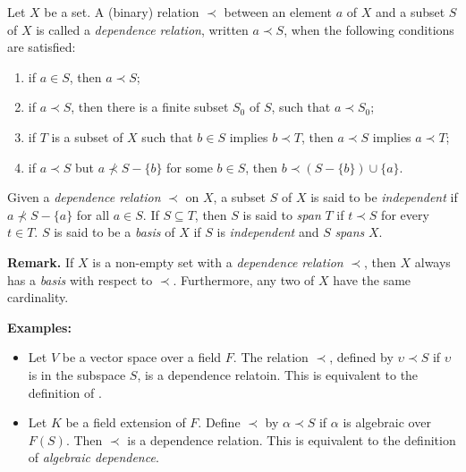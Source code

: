 \documentclass[12pt]{article}
\begin{document}
Let $X$ be a set. A (binary) relation $\prec$ between an element $a$ of $X$ and a subset $S$ of $X$ is called a \emph{dependence relation}, written $a \prec S$, when the following conditions are satisfied:
\begin{enumerate}
\item
if $a \in S$, then $a \prec S$;
\item
if $a \prec S$, then there is a finite subset $S_0$ of $S$, such that $a \prec S_0$;
\item
if $T$ is a subset of $X$ such that $b \in S$ implies $b \prec T$, then $a \prec S$ implies $a \prec T$;
\item
if $a \prec S$ but $a \not\prec S-\lbrace b \rbrace$ for some $b \in S$, then $b \prec (S-\lbrace b \rbrace)\cup\lbrace a \rbrace$.
\end{enumerate}

Given a \emph{dependence relation} $\prec$ on $X$,  a subset $S$ of $X$ is said to be \emph{independent} if $a \not\prec S - \lbrace a \rbrace$ for all $a \in S$.  If $S \subseteq T$, then $S$ is said to \emph{span} $T$ if $t \prec S$ for every $t \in T$.  $S$ is said to be a \emph{basis} of $X$ if $S$ is \emph{independent} and $S$ \emph{spans} $X$.

\vspace{8mm}

\textbf{Remark.}  If $X$ is a non-empty set with a \emph{dependence relation} $\prec$, then $X$ always has a \emph{basis} with respect to $\prec$.  Furthermore, any two {\em {}} of $X$ have the same cardinality.

\vspace{8mm}

\textbf{Examples:}
\begin{itemize}
\item
Let $V$ be a vector space over a field $F$.  The relation $\prec$, defined by $\upsilon \prec S$ if $\upsilon$ is in the subspace  $S$, is a dependence relatoin.  This is equivalent to the definition of {\em {}}.
\item
Let $K$ be a field extension of $F$.  Define $\prec$ by $\alpha \prec S$ if $\alpha$ is algebraic over $F(S)$. Then $\prec$ is a dependence relation.  This is equivalent to the definition of \emph{algebraic dependence}.  
\end{itemize}
\end{document}

